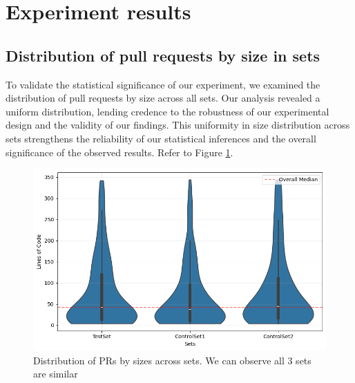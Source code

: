 \section{Experiment results}

\subsection{Distribution of pull requests by size in sets}
To validate the statistical significance of our experiment, we examined the distribution of pull requests by size across all sets. Our analysis revealed a uniform distribution, lending credence to the robustness of our experimental design and the validity of our findings. This uniformity in size distribution across sets strengthens the reliability of our statistical inferences and the overall significance of the observed results. Refer to Figure \ref{fig:pr_dist_across_sets}.

\begin{figure}[htbp]
    \centering
    \includegraphics[width=1\columnwidth]
    {Figures/pr_dist.png}
    \caption{Distribution of PRs by sizes across sets. We can observe all 3 sets are similar}
    \label{fig:pr_dist_across_sets}
\end{figure}



